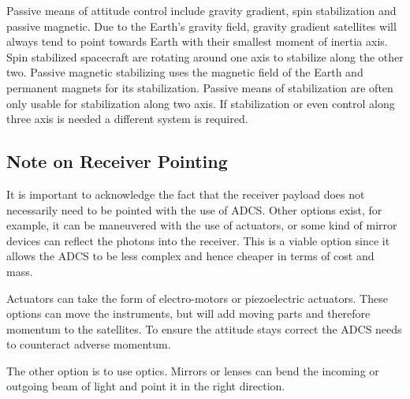 Passive means of attitude control include gravity gradient, spin stabilization and passive magnetic. Due to the Earth's gravity field, gravity gradient satellites will always tend to point towards Earth with their smallest moment of inertia axis. Spin stabilized spacecraft are rotating around one axis to stabilize along the other two. Passive magnetic stabilizing uses the magnetic field of the Earth and permanent magnets for its stabilization. Passive means of stabilization are often only usable for stabilization along two axis. If stabilization or even control along three axis is needed a different system is required.

\subsection{Note on Receiver Pointing}
It is important to acknowledge the fact that the receiver payload does not necessarily need to be pointed with the use of \ac{ADCS}. Other options exist, for example, it can be maneuvered with the use of actuators, or some kind of mirror devices can reflect the photons into the receiver. This is a viable option since it allows the \ac{ADCS} to be less complex and hence cheaper in terms of cost and mass.

Actuators can take the form of electro-motors or piezoelectric actuators. These options can move the instruments, but will add moving parts and therefore momentum to the satellites. To ensure the attitude stays correct the \ac{ADCS} needs to counteract adverse momentum.

The other option is to use optics. Mirrors or lenses can bend the incoming or outgoing beam of light and point it in the right direction.


